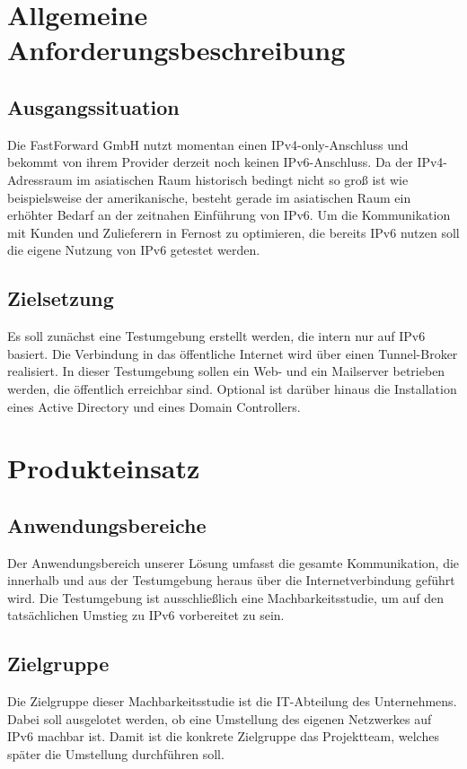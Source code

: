 \section{Allgemeine Anforderungsbeschreibung}

\subsection{Ausgangssituation}

Die FastForward GmbH nutzt momentan einen IPv4-only-Anschluss und bekommt von ihrem Provider derzeit noch keinen IPv6-Anschluss. Da der IPv4-Adressraum im asiatischen Raum historisch bedingt nicht so groß ist wie beispielsweise der amerikanische, besteht gerade im asiatischen Raum ein erhöhter Bedarf an der zeitnahen Einführung von IPv6. Um die Kommunikation mit Kunden und Zulieferern in Fernost zu optimieren, die bereits IPv6 nutzen soll die eigene Nutzung von IPv6 getestet werden.

\subsection{Zielsetzung}

Es soll zunächst eine Testumgebung erstellt werden, die intern nur auf IPv6 basiert. Die Verbindung in das öffentliche Internet wird über einen Tunnel-Broker realisiert. In dieser Testumgebung sollen ein Web- und ein Mailserver betrieben werden, die öffentlich erreichbar sind. Optional ist darüber hinaus die Installation eines Active Directory und eines Domain Controllers.\section{Produkteinsatz}

\subsection{Anwendungsbereiche}
Der Anwendungsbereich unserer Lösung umfasst die gesamte Kommunikation, die innerhalb und aus der Testumgebung heraus über die Internetverbindung geführt wird. Die Testumgebung ist ausschließlich eine Machbarkeitsstudie, um auf den tatsächlichen Umstieg zu IPv6 vorbereitet zu sein.

\subsection{Zielgruppe}
Die Zielgruppe dieser Machbarkeitsstudie ist die IT-Abteilung des Unternehmens. Dabei soll ausgelotet werden, ob eine Umstellung des eigenen Netzwerkes auf IPv6 machbar ist. Damit ist die konkrete Zielgruppe das Projektteam, welches später die Umstellung durchführen soll.

